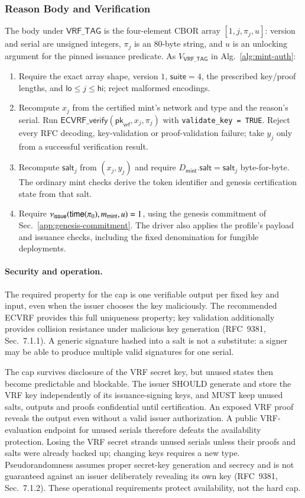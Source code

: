 \subsubsection{Reason Body and Verification}

The body under $\mathsf{VRF\_TAG}$ is the four-element CBOR array $[1,j,\pi_j,u]$: version and serial are unsigned integers, $\pi_j$ is an 80-byte string, and $u$ is an unlocking argument for the pinned issuance predicate. As $V_{\mathsf{VRF\_TAG}}$ in Alg.~\ref{alg:mint-auth}:
\begin{enumerate}
	\item Require the exact array shape, version $1$, $\mathsf{suite}=4$, the prescribed key/proof lengths, and $\mathsf{lo} \le j \le \mathsf{hi}$; reject malformed encodings.
	\item Recompute $x_j$ from the certified mint's network and type and the reason's serial. Run $\mathsf{ECVRF\_verify}(\mathsf{pk}_\mathsf{vrf},x_j,\pi_j)$ with \texttt{validate\_key = TRUE}. Reject every RFC decoding, key-validation or proof-validation failure; take $y_j$ only from a successful verification result.
	\item Recompute $\mathsf{salt}_j$ from $(x_j,y_j)$ and require $D_\mathsf{mint}.\mathsf{salt}=\mathsf{salt}_j$ byte-for-byte. The ordinary mint checks derive the token identifier and genesis certification state from that salt.
	\item Require $\nu_\mathsf{issue}(\mathsf{time}(\pi_0),m_\mathsf{mint},u)=1$, using the genesis commitment of Sec.~\ref{app:genesis-commitment}. The driver also applies the profile's payload and issuance checks, including the fixed denomination for fungible deployments.
\end{enumerate}

\paragraph{Security and operation.} The required property for the cap is one verifiable output per fixed key and input, even when the issuer chooses the key maliciously. The recommended ECVRF provides this full uniqueness property; key validation additionally provides collision resistance under malicious key generation (RFC~9381, Sec.~7.1.1). A generic signature hashed into a salt is not a substitute: a signer may be able to produce multiple valid signatures for one serial.

The cap survives disclosure of the VRF secret key, but unused states then become predictable and blockable. The issuer SHOULD generate and store the VRF key independently of its issuance-signing keys, and MUST keep unused salts, outputs and proofs confidential until certification. An exposed VRF proof reveals the output even without a valid issuer authorization. A public VRF-evaluation endpoint for unused serials therefore defeats the availability protection. Losing the VRF secret strands unused serials unless their proofs and salts were already backed up; changing keys requires a new type. Pseudorandomness assumes proper secret-key generation and secrecy and is not guaranteed against an issuer deliberately revealing its own key (RFC~9381, Sec.~7.1.2). These operational requirements protect availability, not the hard cap.

